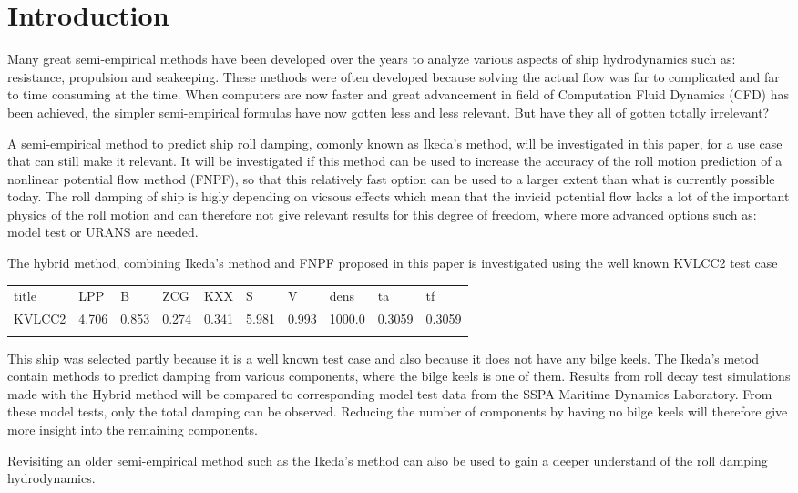 \section{Introduction}\label{introduction}

Many great semi-empirical methods have been developed over the years to
analyze various aspects of ship hydrodynamics such as: resistance,
propulsion and seakeeping. These methods were often developed because
solving the actual flow was far to complicated and far to time consuming
at the time. When computers are now faster and great advancement in
field of Computation Fluid Dynamics (CFD) has been achieved, the simpler
semi-empirical formulas have now gotten less and less relevant. But have
they all of gotten totally irrelevant?

A semi-empirical method to predict ship roll damping, comonly known as
Ikeda's method, will be investigated in this paper, for a use case that
can still make it relevant. It will be investigated if this method can
be used to increase the accuracy of the roll motion prediction of a
nonlinear potential flow method (FNPF), so that this relatively fast
option can be used to a larger extent than what is currently possible
today. The roll damping of ship is higly depending on vicsous effects
which mean that the invicid potential flow lacks a lot of the important
physics of the roll motion and can therefore not give relevant results
for this degree of freedom, where more advanced options such as: model
test or URANS are needed.

The hybrid method, combining Ikeda's method and FNPF proposed in this
paper is investigated using the well known KVLCC2 test case
 
            
    
    
    
 
            
    
    \begin{longtable}[c]{@{}llllllllll@{}}
\toprule\addlinespace
title & LPP & B & ZCG & KXX & S & V & dens & ta & tf\\\addlinespace 
\midrule\endhead
KVLCC2 & 4.706 & 0.853 & 0.274 & 0.341 & 5.981 & 0.993 & 1000.0 & 0.3059 & 0.3059\\\addlinespace 
\bottomrule 
 \end{longtable}

    

    This ship was selected partly because it is a well known test case and
also because it does not have any bilge keels. The Ikeda's metod contain
methods to predict damping from various components, where the bilge
keels is one of them. Results from roll decay test simulations made with
the Hybrid method will be compared to corresponding model test data from
the SSPA Maritime Dynamics Laboratory. From these model tests, only the
total damping can be observed. Reducing the number of components by
having no bilge keels will therefore give more insight into the
remaining components.

Revisiting an older semi-empirical method such as the Ikeda's method can
also be used to gain a deeper understand of the roll damping
hydrodynamics.

    